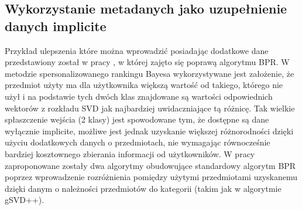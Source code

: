 \documentclass{pracamgr}
\begin{document}
   \subsection{Wykorzystanie metadanych jako uzupełnienie danych implicite}
    Przykład ulepszenia które można wprowadzić posiadając dodatkowe dane przedstawiony został w pracy \cite{191},
    w której zajęto się poprawą algorytmu BPR.\newline
    W metodzie spersonalizowanego rankingu Bayesa wykorzystywane jest założenie, że przedmiot użyty ma dla użytkownika większą wartość od takiego,
    którego nie użył i na podstawie tych dwóch klas znajdowane są wartości odpowiednich wektorów z rozkładu SVD jak najbardziej uwidaczniające tą różnicę.
    Tak wielkie spłaszczenie wejścia (2 klasy) jest spowodowane tym, że dostępne są dane wyłącznie implicite,
    możliwe jest jednak uzyskanie większej różnorodności dzięki użyciu dodatkowych danych o przedmiotach, nie wymagając równocześnie bardziej kosztownego
    zbierania informacji od użytkowników.
    W pracy \cite{191} zaproponowane zostały dwa algorytmy obudowujące standardowy algorytm BPR poprzez wprowadzenie rozróżnienia pomiędzy użytymi przedmiotami
    uzyskanemu dzięki danym o należności przedmiotów do kategorii (takim jak w algorytmie gSVD++).
\end{document}
